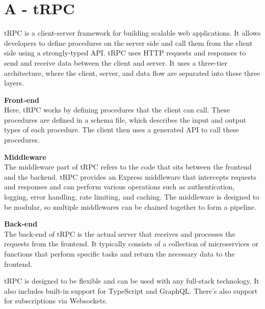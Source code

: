 

\chapter*{A - tRPC}

tRPC is a client-server framework for building scalable web applications. It allows developers to define procedures on the server side and call them from the client side using a strongly-typed API. \cite{trpc_offical} tRPC uses HTTP requests and responses to send and receive data between the client and server. It uses a three-tier architecture, where the client, server, and data flow are separated into these three layers. 

\bigbreak
\noindent
\textbf{Front-end} \\
Here, tRPC works by defining procedures that the client can call. These procedures are defined in a schema file, which describes the input and output types of each procedure. The client then uses a generated API to call these procedures.

\bigbreak
\noindent
\textbf{Middleware} \\
The middleware part of tRPC refers to the code that sits between the frontend and the backend. tRPC provides an Express middleware that intercepts requests and responses and can perform various operations such as authentication, logging, error handling, rate limiting, and caching. The middleware is designed to be modular, so multiple middlewares can be chained together to form a pipeline. 

\bigbreak
\noindent
\textbf{Back-end} \\
The back-end of tRPC is the actual server that receives and processes the requests from the frontend. It typically consists of a collection of microservices or functions that perform specific tasks and return the necessary data to the frontend.  

\bigbreak
\noindent
tRPC is designed to be flexible and can be used with any full-stack technology. It also includes built-in support for TypeScript and GraphQL. There's also support for subscriptions via Websockets. \cite{trpc_subscriptions}

\renewcommand{\thefigure}{A.\arabic{figure}}
\setcounter{figure}{0}
\renewcommand{\thetable}{A.\arabic{table}}
\setcounter{table}{0}

